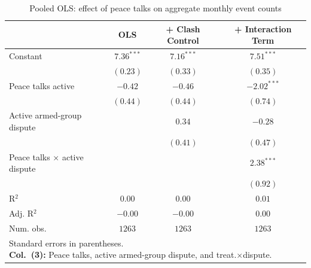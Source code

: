 
\begin{table}
\caption{Pooled OLS: effect of peace talks on aggregate monthly event counts}
\begin{center}
\begin{tabular}{l c c c}
\toprule
 & OLS & + Clash Control & + Interaction Term \\
\midrule
Constant                     & $7.36^{***}$ & $7.16^{***}$ & $7.51^{***}$  \\
                             & $(0.23)$     & $(0.33)$     & $(0.35)$      \\
Peace talks active           & $-0.42$      & $-0.46$      & $-2.02^{***}$ \\
                             & $(0.44)$     & $(0.44)$     & $(0.74)$      \\
Active armed-group dispute   &              & $0.34$       & $-0.28$       \\
                             &              & $(0.41)$     & $(0.47)$      \\
Peace talks × active dispute &              &              & $2.38^{***}$  \\
                             &              &              & $(0.92)$      \\
\midrule
R$^2$                        & $0.00$       & $0.00$       & $0.01$        \\
Adj. R$^2$                   & $-0.00$      & $-0.00$      & $0.00$        \\
Num. obs.                    & $1263$       & $1263$       & $1263$        \\
\bottomrule
\multicolumn{4}{l}{\scriptsize{\parbox{\linewidth}{Standard errors in parentheses.\\[0.35em] \textbf{Col.~(3):} Peace talks, active armed-group dispute, and treat.$\times$dispute.}}}
\end{tabular}
\label{tab:results_pooled_ols}
\end{center}
\end{table}
